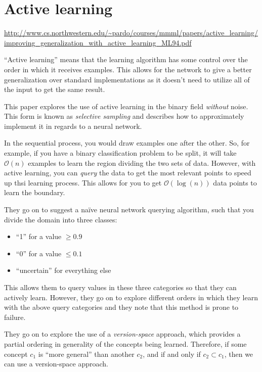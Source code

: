 \documentclass[english,course]{Notes}
\begin{document}
\section{Active learning}

\url{http://www.cs.northwestern.edu/~pardo/courses/mmml/papers/active_learning/improving_generalization_with_active_learning_ML94.pdf}

``Active learning'' means that the learning algorithm has some control over the order in which it receives examples. This allows for the network to give a better generalization over standard implementations as it doesn't need to utilize all of the input to get the same result. 

This paper explores the use of active learning in the binary field {\em without} noise. This form is known as {\em selective sampling} and describes how to approximately implement it in regards to a neural network.

In the sequential process, you would draw examples one after the other. So, for example, if you have a binary classification problem to be split, it will take $\mathcal{O}(n)$ examples to learn the region dividing the two sets of data. However, with active learning, you can {\em query} the data to get the most relevant points to speed up thsi learning process. This allows for you to get $\mathcal{O}(\log(n))$ data points to learn the boundary. 

They go on to suggest a na\"{i}ve neural network querying algorithm, such that you divide the domain into three classes:

\begin{itemize}
  \item ``1'' for a value $\geq 0.9$
  \item ``0'' for a value $\leq 0.1$
  \item ``uncertain'' for everything else
\end{itemize}

This allows them to query values in these three categories so that they can actively learn. However, they go on to explore different orders in which they learn with the above query categories and they note that this method is prone to failure.

They go on to explore the use of a {\em version-space} approach, which provides a partial ordering in generality of the concepts being learned. Therefore, if some concept $c_{1}$ is ``more general'' than another $c_{2}$, and if and only if $c_{2}\subset c_{1}$, then we can use a version-space approach. 
\end{document}

